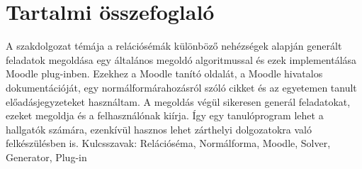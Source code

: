 \chapter*{Tartalmi összefoglaló}

A szakdolgozat témája a relációsémák különböző nehézségek alapján generált feladatok megoldása egy általános megoldó algoritmussal és ezek implementálása Moodle plug-inben. Ezekhez a Moodle tanító oldalát, a Moodle hivatalos dokumentációját, egy normálformárahozásról szóló cikket és az egyetemen tanult előadásjegyzeteket használtam. A megoldás végül sikeresen generál feladatokat, ezeket megoldja és a felhasználónak kiírja. Így egy tanulóprogram lehet a hallgatók számára, ezenkívül hasznos lehet zárthelyi dolgozatokra való felkészülésben is.\hfill \break
Kulcsszavak: Relációséma, Normálforma, Moodle, Solver, Generator, Plug-in